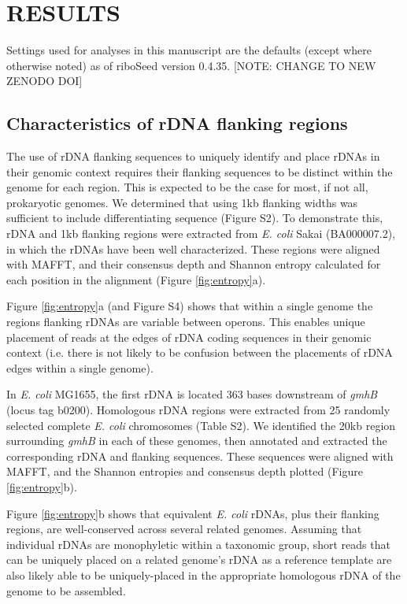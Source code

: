 \documentclass[a4,center,fleqn]{NAR}
\begin{document}
\section{RESULTS}

Settings used for analyses in this manuscript are the defaults (except where otherwise noted) as of riboSeed version 0.4.35\cite{nicholas_r_waters_2017_832131}. [NOTE: CHANGE TO NEW ZENODO DOI]

\subsection*{Characteristics of rDNA flanking regions}
The use of rDNA flanking sequences to uniquely identify and place rDNAs in their genomic context requires their flanking sequences to be distinct within the genome for each region. This is expected to be the case for most, if not all, prokaryotic genomes. We determined that using 1kb flanking widths was sufficient to include differentiating sequence (Figure S2). To demonstrate this, rDNA and 1kb flanking regions were extracted from \textit{E. coli} Sakai \cite{Hayashi2001} (BA000007.2), in which the rDNAs have been well characterized\cite{Ohnishi2000}. These regions were aligned with MAFFT\cite{Katoh2002}, and their consensus depth and Shannon entropy calculated for each position in the alignment (Figure \ref{fig:entropy}a).

Figure \ref{fig:entropy}a (and Figure S4) shows that within a single genome the regions flanking rDNAs are variable between operons. This enables unique placement of reads at the edges of rDNA coding sequences in their genomic context (i.e. there is not likely to be confusion between the placements of rDNA edges within a single genome).

In \textit{E. coli} MG1655, the first rDNA is located 363 bases downstream of \textit{gmhB} (locus tag b0200). Homologous rDNA regions were extracted from 25 randomly selected complete \textit{E. coli} chromosomes (Table S2).  We identified the 20kb region surrounding \textit{gmhB} in each of these genomes, then annotated and extracted the corresponding rDNA and flanking sequences. These sequences were aligned with MAFFT, and the Shannon entropies and consensus depth plotted (Figure \ref{fig:entropy}b).

Figure \ref{fig:entropy}b shows that equivalent \textit{E. coli} rDNAs, plus their flanking regions, are well-conserved across several related genomes. Assuming that individual rDNAs are monophyletic within a taxonomic group, short reads that can be uniquely placed on a related genome's rDNA as a reference template are also likely able to be uniquely-placed in the appropriate homologous rDNA of the genome to be assembled.
\end{document}
